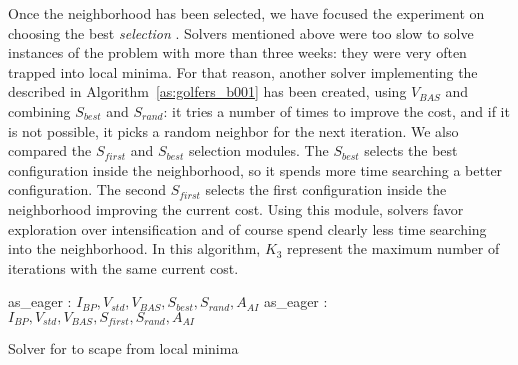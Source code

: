 \separation

Once the neighborhood \om{} has been selected, we have focused the experiment on choosing the best {\it selection} \om. Solvers mentioned above were too slow to solve instances of the problem with more than three weeks: they were very often trapped into local minima. For that reason, another solver implementing the \as{} described in Algorithm~\ref{as:golfers_b001} has been created, using $V_{BAS}$ and combining $S_{best}$ and $S_{rand}$: it tries a number of times to improve the cost, and if it is not possible, it picks a random neighbor for the next iteration. We also compared the $S_{first}$ and $S_{best}$ selection modules. The \om{} $S_{best}$ selects the best configuration inside the neighborhood, so it spends more time searching a better configuration. %
The second \om{} $S_{first}$ selects the first configuration inside the neighborhood improving the current cost. Using this module, solvers favor exploration over intensification and of course spend clearly less time searching into the neighborhood. In this algorithm, $K_3$ represent the maximum number of iterations with the same current cost.

\begin{algorithm}[H]
\dontprintsemicolon
\SetNoline
{}
   as\_eager\;
\algoindent {} : $I_{BP}, V_{std}, V_{BAS}, S_{best}, S_{rand}, A_{AI}$ \;
   as\_eager\;
\algoindent {} : $I_{BP}, V_{std}, V_{BAS}, S_{first}, S_{rand}, A_{AI}$ \;
\caption{Solver for \SGP{} to scape from local minima}\label{as:golfers_b001}
\end{algorithm}

